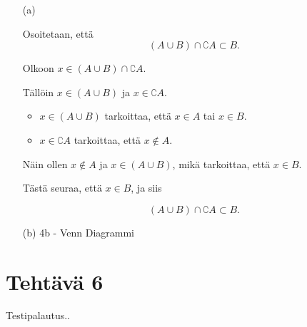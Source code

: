 \documentclass{article}
\begin{document}
\begin{enumerate}
	
\item[(a)]

Osoitetaan, että
\[
(A \cup B) \cap \complement A \subset B.
\]

Olkoon \(x \in (A \cup B) \cap \complement A\).

Tällöin \(x \in (A \cup B)\) ja \(x \in \complement A\).

\begin{itemize}
	\item \(x \in (A \cup B)\) tarkoittaa, että \(x \in A\) tai \(x \in B\).
	\item \(x \in \complement A\) tarkoittaa, että \(x \notin A\).
\end{itemize}

Näin ollen \(x \notin A\) ja \(x \in (A \cup B)\), mikä tarkoittaa, että \(x \in B\).

Tästä seuraa, että \(x \in B\), ja siis

\[
(A \cup B) \cap \complement A \subset B.
\]


\item[(b)]
4b - Venn Diagrammi


\end{enumerate}


\newpage

\section*{Tehtävä 6}

Testipalautus..
\end{document}
